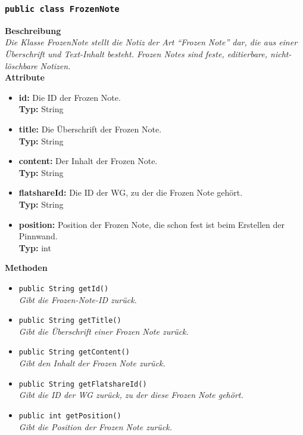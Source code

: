 \subsubsection{\texttt{public class FrozenNote}}

	\textbf{Beschreibung} \\
	\textit{Die Klasse FrozenNote stellt die Notiz der Art “Frozen Note” dar, die aus einer Überschrift und Text-Inhalt besteht. Frozen Notes sind feste, editierbare, nicht-löschbare Notizen.} \\
	
	\textbf{Attribute}
	\begin{itemize}
		\item \textbf{id:} Die ID der Frozen Note. \\
		\textbf{Typ:} String
		\item \textbf{title:} Die Überschrift der Frozen Note. \\
		\textbf{Typ:} String
		\item \textbf{content:} Der Inhalt der Frozen Note. \\
		\textbf{Typ:} String
		\item \textbf{flatshareId:} Die ID der WG, zu der die Frozen Note gehört. \\
		\textbf{Typ:} String
		\item \textbf{position:} Position der Frozen Note, die schon fest ist beim Erstellen der Pinnwand.\\
		\textbf{Typ:} int
	\end{itemize}
	
	\textbf{Methoden}
	\begin{itemize}
		\item\texttt{{public String getId()}}\\
		\textit{Gibt die Frozen-Note-ID zurück.}\\
		
		\item\texttt{{public String getTitle()}}\\
		\textit{Gibt die Überschrift einer Frozen Note zurück.}\\
		
		\item\texttt{{public String getContent()}}\\
		\textit{Gibt den Inhalt der Frozen Note zurück.}\\
		
		\item\texttt{{public String getFlatshareId()}}\\
		\textit{Gibt die ID der WG zurück, zu der diese Frozen Note gehört.}\\
		
		\item\texttt{{public int getPosition()}}\\
		\textit{Gibt die Position der Frozen Note zurück.}\\
	\end{itemize}

